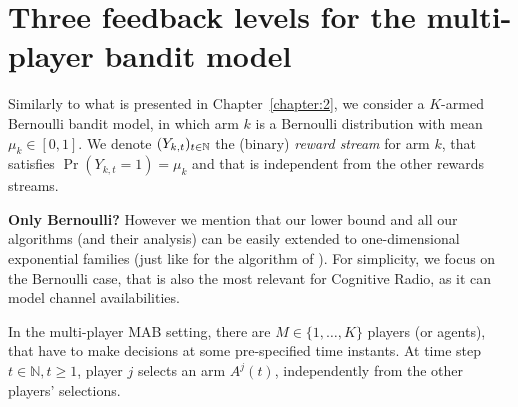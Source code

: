 \section{Three feedback levels for the multi-player bandit model}
\label{sec:5:model}

Similarly to what is presented in Chapter~\ref{chapter:2},
we consider a $K$-armed Bernoulli bandit model, %
in which arm $k$ is a Bernoulli distribution with mean $\mu_k\in[0,1]$.
We denote $(Y_{k,t})_{t\in\mathbb{N}}$ the \iid{} (binary) \emph{reward stream} for arm $k$, that satisfies $\Pr(Y_{k,t}=1) = \mu_k$ and that is independent from the other rewards streams.

\textbf{Only Bernoulli?}
However we mention that our lower bound and all our algorithms (and their analysis) can be easily extended to one-dimensional exponential families (just like for the \klUCB{} algorithm of \cite{KLUCBJournal}). For simplicity, we focus on the Bernoulli case, that is also the most relevant for Cognitive Radio, as it can model channel availabilities.





In the multi-player MAB setting, there are $M \in \{1,\dots,K\}$ players (or agents),
that have to make decisions at some pre-specified time instants.
At time step $t \in\mathbb{N},t\geq1$, player $j$ selects an arm $A^j(t)$, independently from the other players' selections.

